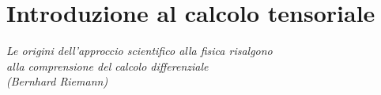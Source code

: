\chapter{Introduzione al calcolo tensoriale}\label{sec:calcolo}
\vspace{-1.0cm}
\begin{flushright}
\textit{
 Le origini dell'approccio scientifico alla fisica risalgono \\alla comprensione del calcolo differenziale \\
(Bernhard Riemann)
}
\end{flushright}
\vspace{+1.0cm}
\minitoc
% 
% 








%









